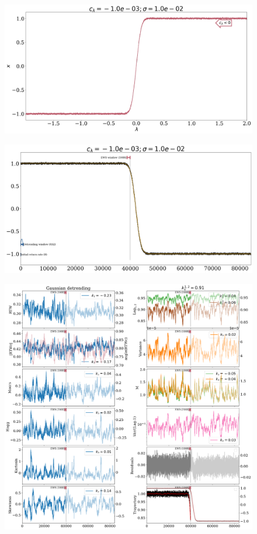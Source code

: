 \begin{figure}
	\centering
	\includegraphics[width=0.7\linewidth]{"Images/Metrics/sharp transition/bifurcation_additive"}
	\caption{}
	\label{fig:bifurcationadditive}
\end{figure}
\begin{figure}
	\centering
	\includegraphics[width=0.7\linewidth]{"Images/Metrics/sharp transition/detrend_additive"}
	\caption{}
	\label{fig:detrendadditive}
\end{figure}
\begin{figure}
	\centering
	\includegraphics[width=0.7\linewidth]{"Images/Metrics/sharp transition/Gdet_additive"}
	\caption{}
	\label{fig:gdetadditive}
\end{figure}

